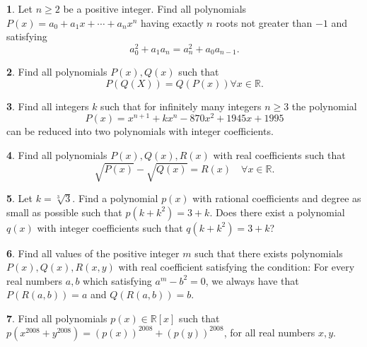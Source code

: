 \documentclass{article}
\theoremstyle{definition}
\newtheorem{p}{}
\begin{document}
\begin{p}
Let $ n \geq 2$ be a positive integer. Find all polynomials $ P(x)=a_0 +a_1 x +\cdots + a_{n} x^n$ having exactly $ n$ roots not greater than $-1$ and satisfying
\[ a^2_0+ a_1 a_n = a^2_n +a_0 a_{n-1}.\]
\end{p}





\begin{p}
Find all polynomials  $ P(x),Q(x)$ such that
\[P(Q(X))=Q(P(x))  \forall x \in \mathbb R.\]
\end{p}





\begin{p}
Find all integers $ k$ such that for infinitely many integers $ n \ge 3$ the polynomial
\[ P(x) =x^{n+ 1}+ kx^n - 870x^2 + 1945x + 1995\]
can be reduced into two polynomials with integer coefficients.
\end{p}





\begin{p}
Find all polynomials $ P(x),Q(x),R(x)$ with real coefficients such that
\[\sqrt{P(x)}-\sqrt{Q(x)}=R(x) \quad \forall x \in \mathbb R.\]
\end{p}





\begin{p}
Let $k = \sqrt[3]{3}$. Find a polynomial $p(x)$ with rational coefficients and degree as small as possible such that $p(k+k^{2}) = 3+k$. Does there exist a polynomial $q(x)$ with integer coefficients such that $q(k+k^{2}) = 3+k$?
\end{p}





\begin{p}
Find all values of the positive integer $ m$ such that there exists polynomials $ P(x),Q(x),R(x,y)$ with real coefficient satisfying the condition: For every real numbers $ a,b$ which satisfying $ a^m-b^2=0$, we always have that $ P(R(a,b))=a$ and $ Q(R(a,b))=b$.
\end{p}





\begin{p}
Find all polynomials $ p(x)\in \mathbb{R}[x]$ such that $ p(x^{2008} + y^{2008}) = (p(x))^{2008}+(p(y))^{2008}$, for all real numbers $ x, y$.
\end{p}
\end{document}
